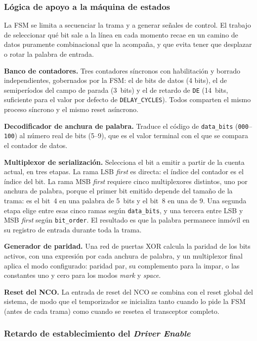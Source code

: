 \subsubsection{Lógica de apoyo a la máquina de estados}

La FSM se limita a secuenciar la trama y a generar señales de control. El trabajo de seleccionar
qué bit sale a la línea en cada momento recae en un camino de datos puramente combinacional que
la acompaña, y que evita tener que desplazar o rotar la palabra de entrada.

\textbf{Banco de contadores.} Tres contadores síncronos con habilitación y borrado independientes,
gobernados por la FSM: el de bits de datos (4 bits), el de semiperíodos del campo de parada
(3~bits) y el de retardo de \texttt{DE} (14~bits, suficiente para el valor por defecto de
\texttt{DELAY\_CYCLES}). Todos comparten el mismo proceso síncrono y el mismo reset asíncrono.

\textbf{Decodificador de anchura de palabra.} Traduce el código de \texttt{data\_bits}
(\texttt{000}--\texttt{100}) al número real de bits (5--9), que es el valor terminal con el que se
compara el contador de datos.

\textbf{Multiplexor de serialización.} Selecciona el bit a emitir a partir de la cuenta actual, en
tres etapas. La rama LSB \textit{first} es directa: el índice del contador es el índice del bit. La
rama MSB \textit{first} requiere cinco multiplexores distintos, uno por anchura de palabra, porque
el primer bit emitido depende del tamaño de la trama: es el bit~4 en una palabra de 5~bits y el
bit~8 en una de 9. Una segunda etapa elige entre esas cinco ramas según \texttt{data\_bits}, y una
tercera entre LSB y MSB \textit{first} según \texttt{bit\_order}. El resultado es que la palabra
permanece inmóvil en su registro de entrada durante toda la trama.

\textbf{Generador de paridad.} Una red de puertas XOR calcula la paridad de los bits activos, con
una expresión por cada anchura de palabra, y un multiplexor final aplica el modo configurado: paridad
par, su complemento para la impar, o las constantes uno y cero para los modos \textit{mark} y
\textit{space}.

\textbf{Reset del NCO.} La entrada de reset del NCO se combina con el reset global del sistema, de
modo que el temporizador se inicializa tanto cuando lo pide la FSM (antes de cada trama) como
cuando se resetea el transceptor completo.

\subsubsection{Retardo de establecimiento del \textit{Driver Enable}}

